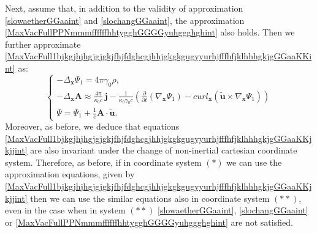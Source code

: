 \documentclass{article}
\theoremstyle{definition}
\theoremstyle{remark}
\renewcommand{\vec}[1]{\mathbf{#1}}
\newcommand{\er}{\eqref}
\newcommand{\er}{\eqref}
\begin{document}
Next, assume that, in addition to the validity of approximation
\er{slowaetherGGaaint} and \er{slochangGGaaint}, the approximation
\er{MaxVacFullPPNmmmffffffhhtygghGGGGyuhggghghint} also holds. Then
we further approximate
\er{MaxVacFull1bjkgjhjhgjgjgkjfhjfdghcgjhhjgkgkgugyyurhjfffhfjklhhhgkjgGGaaKKint}
as:
\begin{equation}\label{MaxVacFull1bjkgjhjhgjgjgkjfhjfdghcgjhhjgkgkgugyyurhjfffhfjklhhhgkjgGGaaKKjkjjint}
\begin{cases}
-\Delta_{\vec x}\Psi_1=4\pi\gamma_0\rho,\\
-\Delta_{\vec x}\vec A \approx \frac{4\pi}{\kappa_0 c}\,\vec
j-\frac{1}{\kappa_0\gamma_0 c}\left(\frac{\partial}{\partial
t}\left(\nabla_{\vec
x}\Psi_1\right)-curl_{\vec x}\left(\vec {\tilde u}\times\nabla_{\vec x}\Psi_1\right)\right)\\
\Psi=\Psi_1+\frac{1}{c}\vec A\cdot\vec {\tilde u}.
\end{cases}
\end{equation}
Moreover, as before, we deduce that equations
\er{MaxVacFull1bjkgjhjhgjgjgkjfhjfdghcgjhhjgkgkgugyyurhjfffhfjklhhhgkjgGGaaKKjkjjint}
are also invariant under the change of non-inertial cartesian
coordinate system. Therefore, as before, if in coordinate system
$(*)$ we can use the approximation equations, given by
\er{MaxVacFull1bjkgjhjhgjgjgkjfhjfdghcgjhhjgkgkgugyyurhjfffhfjklhhhgkjgGGaaKKjkjjint}
then we can use the similar equations
also in coordinate system $(**)$, even in the case when in system
$(**)$ \er{slowaetherGGaaint}, \er{slochangGGaaint} or
\er{MaxVacFullPPNmmmffffffhhtygghGGGGyuhggghghint} are not
satisfied.
\end{document}
